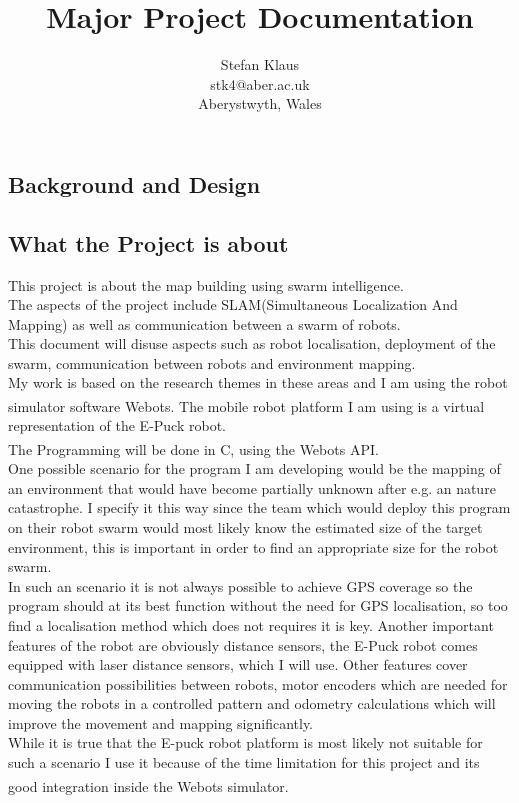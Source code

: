 \documentclass[10pt,a4paper]{article}
\author{Stefan Klaus\\stk4@aber.ac.uk\\Aberystwyth, Wales}
\title{Major Project Documentation}
\begin{document}

\maketitle
\newpage
\tableofcontents
\listoffigures
\newpage
\begin{flushleft}
\section{Background and Design}
\subsection{What the Project is about}
This project is about the map building using swarm intelligence.\\
The aspects of the project include SLAM(Simultaneous Localization And Mapping) as well as communication between a swarm of robots.\\
This document will disuse aspects such as robot localisation, deployment of the swarm, communication between robots and environment mapping.\\
My work is based on the research themes in these areas and I am using the robot simulator software Webots\textsuperscript{\texttrademark}. The mobile robot platform I am using is a virtual representation of the E-Puck robot. \\
The Programming will be done in C, using the Webots\textsuperscript{\texttrademark} API.\\[3ex]

One possible scenario for the program I am developing would be the mapping of an environment that would have become partially unknown after e.g. an nature catastrophe. I specify it this way since the team which would deploy this program on their robot swarm would most likely know the estimated size of the target environment, this is important in order to find an appropriate size for the robot swarm.\\
In such an scenario it is not always possible to achieve GPS coverage so the program should at its best function without the need for GPS localisation, so too find a localisation method which does not requires it is key. Another important features of the robot are obviously distance sensors, the E-Puck robot comes equipped with laser distance sensors, which I will use. Other features cover communication possibilities between robots, motor encoders which are needed for moving the robots in a controlled pattern and odometry calculations which will improve the movement and mapping significantly. \\[3ex]
While it is true that the E-puck robot platform is most likely not suitable for such a scenario I use it because of the time limitation for this project and its good integration inside the Webots\textsuperscript{\texttrademark} simulator. 



\end{flushleft}
\end{document}
